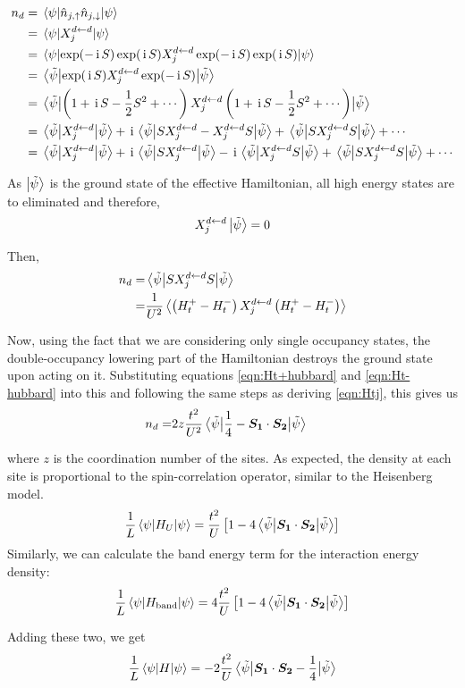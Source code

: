 \documentclass[]{report}
\renewcommand{\vec}{\bm}
\newcommand{\I}{\,\mathrm{i}\,}
\begin{document}
\begin{align}
\nonumber
n_d &= \expval{ \hat{n}_{j,\uparrow} \hat{n}_{j,\downarrow} }{\psi}\\
\nonumber
&= \expval{X^{d \leftarrow d}_{j}}{\psi}\\
\nonumber
&= \expval{\exp(-\I S)\exp(\I S)X^{d \leftarrow d}_{j}\exp(-\I S)\exp(\I S)}{\psi}\\
\nonumber
&= \expval{\exp(\I S)X^{d \leftarrow d}_{j}\exp(-\I S)}{\tilde{\psi}}\\
\nonumber
&= \expval{\left( 1 + \I S - \frac{1}{2} S^2 + \cdots \right) X^{d \leftarrow d}_{j} \left( 1 + \I S - \frac{1}{2} S^2 + \cdots \right) }{\tilde{\psi}}\\
\nonumber
&= \expval{X^{d \leftarrow d}_{j}}{\tilde{\psi}} + \I \expval{S X^{d \leftarrow d}_{j} - X^{d \leftarrow d}_{j} S}{\tilde{\psi}} + \expval{S X^{d \leftarrow d}_{j} S}{\tilde{\psi}} + \cdots\\
&= \expval{X^{d \leftarrow d}_{j}}{\tilde{\psi}} + \I \expval{S X^{d \leftarrow d}_{j}}{\tilde{\psi}} - \I \expval{X^{d \leftarrow d}_{j} S}{\tilde{\psi}} + \expval{S X^{d \leftarrow d}_{j} S}{\tilde{\psi}} + \cdots
\end{align}

As $ \ket{\tilde{\psi}} $ is the ground state of the effective Hamiltonian, all high energy states are to eliminated and therefore,
\begin{align}
X^{d \leftarrow d}_{j}\ket{\tilde{\psi} }= 0
\end{align}

Then,
\begin{align}
\nonumber
n_d 
=&
\expval{S X^{d \leftarrow d}_{j} S}{\tilde{\psi}}\\
=&
\frac{1}{U^2}\expval{\left(H^{+}_t - H^{-}_{t}\right)X^{d \leftarrow d}_{j}\left(H^{+}_t - H^{-}_{t}\right)}
\end{align}

Now, using the fact that we are considering only single occupancy states, the double-occupancy lowering part of the Hamiltonian destroys the ground state upon acting on it. Substituting equations \eqref{eqn:Ht+hubbard} and \eqref{eqn:Ht-hubbard} into this and following the same steps as deriving \eqref{eqn:Htj}, this gives us
\begin{align}
\nonumber
n_d =&
2z\frac{t^2}{U^2} \expval{\frac{1}{4} - \vec{S_{1}}\cdot\vec{S_{2}}}{\tilde{\psi}}
\end{align}

where $ z $ is the coordination number of the sites. As expected, the density at each site is proportional to the spin-correlation operator, similar to the Heisenberg model.
\begin{align}
\frac{1}{L}\expval{H_U}{\psi} = \frac{t^2}{U} \left[1 - 4 \expval{\vec{S_{1}}\cdot\vec{S_{2}}}{\tilde{\psi}} \right]
\end{align}
Similarly, we can calculate the band energy term for the interaction energy density:
\begin{align}
\frac{1}{L}\expval{H_\mathrm{band}}{\psi} = 4\frac{t^2}{U} \left[1 - 4 \expval{\vec{S_{1}}\cdot\vec{S_{2}}}{\tilde{\psi}} \right]
\end{align}

Adding these two, we get
\begin{align}
\frac{1}{L}\expval{H}{\psi} = -2\frac{t^2}{U}  \expval{\vec{S_{1}}\cdot\vec{S_{2}} - \frac{1}{4}}{\tilde{\psi}}
\end{align}

\nocite{*}


\end{document}
